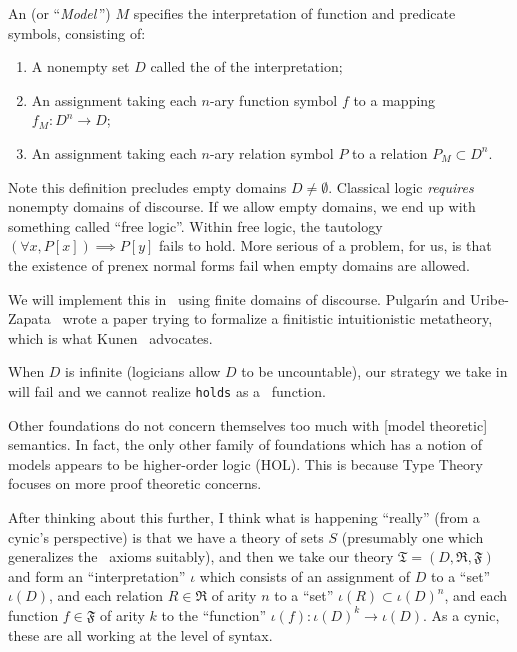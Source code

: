 

\begin{node}[Semantics]\label{fol-0005}%
\begin{definition}\label{fol-0006}%
An  (or ``\textit{Model}\,'') $M$ specifies the
interpretation of function and predicate symbols, consisting of:
\begin{enumerate}
\item A nonempty set $D$ called the  of the interpretation;
\item An assignment taking each $n$-ary function symbol $f$ to a mapping
  $f_{M}\colon D^{n}\to D$;
\item An assignment taking each $n$-ary relation symbol $P$ to a
  relation $P_{M}\subset D^{n}$.
\end{enumerate}
\begin{node}\label{fol-000A}%
Note this definition precludes empty domains $D\neq\emptyset$. Classical
logic \emph{requires} nonempty domains of discourse. If we allow empty
domains, we end up with something called ``free logic''. Within free
logic, the tautology $(\forall x,P[x])\implies P[y]$ fails to hold.
More serious of a problem, for us, is that the existence of prenex
normal forms fail when empty domains are allowed.
\end{node}

\begin{node}\label{fol-000B}%
We will implement this in \SML\ using finite domains of discourse.
Pulgar\'{\i}n and Uribe-Zapata~\cite{pulgarin2023came} wrote a paper
trying to formalize a finitistic intuitionistic metatheory, which is
what Kunen~\cite{kunen2009foundations} advocates.

When $D$ is infinite (logicians allow $D$ to be uncountable), our
strategy we take in  will fail and we cannot realize
\texttt{holds} as a \SML\ function.
\end{node}

\begin{node}\label{fol-000C}%
Other foundations do not concern themselves too much with
[model theoretic] semantics. In fact, the only other family of
foundations which has a notion of models appears to be higher-order
logic (HOL). This is because Type Theory focuses on more proof theoretic
concerns.

\begin{node}\label{fol-000H}%
After thinking about this further, I think what is happening ``really''
(from a cynic's perspective) is that we have a theory of sets $S$
(presumably one which generalizes the \ZF\ axioms suitably), and then we
take our theory $\mathfrak{T}=(D,\mathfrak{R},\mathfrak{F})$ and form an ``interpretation''
$\iota$ which consists of an assignment of $D$ to a ``set'' $\iota(D)$,
and each relation $R\in\mathfrak{R}$ of arity $n$ to a ``set''
$\iota(R)\subset\iota(D)^{n}$, and each function $f\in\mathfrak{F}$ of
arity $k$ to the ``function'' $\iota(f)\colon\iota(D)^{k}\to\iota(D)$.
As a cynic, these are all working at the level of syntax.


\end{node}
\end{node}
\end{definition}
\end{node}
